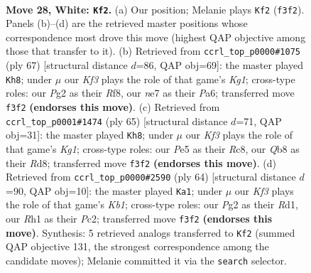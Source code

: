 \documentclass[11pt]{article}
\begin{document}
\clearpage

\begin{figure}[p]\centering
\begin{subfigure}{0.46\textwidth}\centering
\resizebox{\linewidth}{!}{%
\newchessgame
\chessboard[
  setfen={1Qb2kr1/4n3/2q5/4Pp2/p7/P4K2/2P3Pp/R6R w - - 1 28},
  showmover=false,
  pgfstyle=straightmove, color=movearrow, markmove={f3-f2}
]}
\caption{}
\end{subfigure}\hfill
\begin{subfigure}{0.46\textwidth}\centering
\resizebox{\linewidth}{!}{%
\newchessgame
\chessboard[
  setfen={5rk1/6r1/p2pQ3/2pPP3/1q6/2N1B3/1P1K3P/8 b - - 3 34},
  showmover=false,
  pgfstyle=straightmove, color=movearrow, markmove={g8-h8}
]}
\caption{}
\end{subfigure}
\\[4pt]
\begin{subfigure}{0.46\textwidth}\centering
\resizebox{\linewidth}{!}{%
\newchessgame
\chessboard[
  setfen={2rr2k1/1p3Qpp/8/8/p2NP3/1P1K1R2/PB4q1/8 b - - 0 33},
  showmover=false,
  pgfstyle=straightmove, color=movearrow, markmove={g8-h8}
]}
\caption{}
\end{subfigure}\hfill
\begin{subfigure}{0.46\textwidth}\centering
\resizebox{\linewidth}{!}{%
\newchessgame
\chessboard[
  setfen={5b2/1q2k3/pn3pQ1/2p1p3/2P1P3/p2R4/2P2P1r/1K1R4 w - - 2 33},
  showmover=false,
  pgfstyle=straightmove, color=movearrow, markmove={b1-a1}
]}
\caption{}
\end{subfigure}
\caption{\textbf{Move 28, White: \texttt{Kf2}.} (a) Our position; Melanie plays \texttt{Kf2} (\texttt{f3f2}). Panels (b)--(d) are the retrieved master positions whose correspondence most drove this move (highest QAP objective among those that transfer to it). (b) Retrieved from \texttt{ccrl\_top\_p0000\#1075} (ply 67) [structural distance $d$=86, QAP obj=69]: the master played \texttt{Kh8}; under $\mu$ our \emph{Kf3} plays the role of that game's \emph{Kg1}; cross-type roles: our \emph{P}g2 as their \emph{R}f8, our \emph{n}e7 as their \emph{P}a6; transferred move \texttt{f3f2} \textbf{(endorses this move)}. (c) Retrieved from \texttt{ccrl\_top\_p0001\#1474} (ply 65) [structural distance $d$=71, QAP obj=31]: the master played \texttt{Kh8}; under $\mu$ our \emph{Kf3} plays the role of that game's \emph{Kg1}; cross-type roles: our \emph{P}e5 as their \emph{R}c8, our \emph{Q}b8 as their \emph{R}d8; transferred move \texttt{f3f2} \textbf{(endorses this move)}. (d) Retrieved from \texttt{ccrl\_top\_p0000\#2590} (ply 64) [structural distance $d$=90, QAP obj=10]: the master played \texttt{Ka1}; under $\mu$ our \emph{Kf3} plays the role of that game's \emph{Kb1}; cross-type roles: our \emph{P}g2 as their \emph{R}d1, our \emph{R}h1 as their \emph{P}c2; transferred move \texttt{f3f2} \textbf{(endorses this move)}. Synthesis: 5 retrieved analogs transferred to \texttt{Kf2} (summed QAP objective 131, the strongest correspondence among the candidate moves); Melanie committed it via the \texttt{search} selector.}
\label{fig:thought-m54}
\end{figure}
\end{document}
